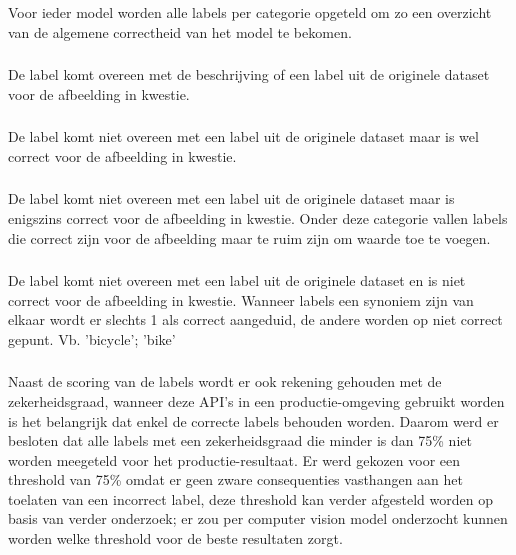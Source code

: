 Voor ieder model worden alle labels per categorie opgeteld om zo een overzicht van de algemene correctheid van het model te bekomen.

\subsubsection{}
\label{sec:completely-correct}
De label komt overeen met de beschrijving of een label uit de originele dataset voor de afbeelding in kwestie.

\subsubsection{}
\label{sec:correct}
De label komt niet overeen met een label uit de originele dataset maar is wel correct voor de afbeelding in kwestie.

\subsubsection{}
\label{sec:somewhat-correct}
De label komt niet overeen met een label uit de originele dataset maar is enigszins correct voor de afbeelding in kwestie. Onder deze categorie vallen labels die correct zijn voor de afbeelding maar te ruim zijn om waarde toe te voegen.

\subsubsection{}
\label{sec:not-correct}
De label komt niet overeen met een label uit de originele dataset en is niet correct voor de afbeelding in kwestie. Wanneer labels een synoniem zijn van elkaar wordt er slechts 1 als correct aangeduid, de andere worden op niet correct gepunt.
Vb. 'bicycle'; 'bike'


\subsubsection{}
\label{sec:scoring-thresholding}
Naast de scoring van de labels wordt er ook rekening gehouden met de zekerheidsgraad, wanneer deze API's in een productie-omgeving gebruikt worden is het belangrijk dat enkel de correcte labels behouden worden. Daarom werd er besloten dat alle labels met een zekerheidsgraad die minder is dan 75\% niet worden meegeteld voor het productie-resultaat. Er werd gekozen voor een threshold van 75\% omdat er geen zware consequenties vasthangen aan het toelaten van een incorrect label, deze threshold kan verder afgesteld worden op basis van verder onderzoek; er zou per computer vision model onderzocht kunnen worden welke threshold voor de beste resultaten zorgt.

